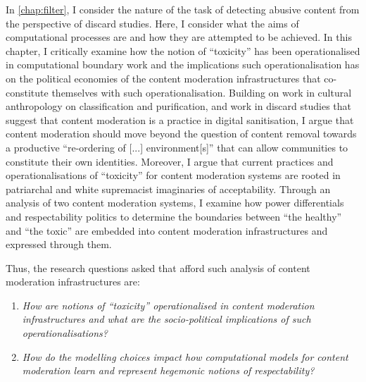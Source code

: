 In \cref{chap:filter}, I consider the nature of the task of detecting abusive content from the perspective of discard studies.
Here, I consider what the aims of computational processes are and how they are attempted to be achieved.
In this chapter, I critically examine how the notion of ``toxicity'' has been operationalised in computational boundary work and the implications such operationalisation has on the political economies of the content moderation infrastructures that co-constitute themselves with such operationalisation.
Building on work in cultural anthropology on classification and purification, and work in discard studies that suggest that content moderation is a practice in digital sanitisation, I argue that content moderation should move beyond the question of content removal towards a productive ``re-ordering of [...] environment[s]'' that can allow communities to constitute their own identities.
Moreover, I argue that current practices and operationalisations of ``toxicity'' for content moderation systems are rooted in patriarchal and white supremacist imaginaries of acceptability.
Through an analysis of two content moderation systems, I examine how power differentials and respectability politics to determine the boundaries between ``the healthy'' and ``the toxic'' are embedded into content moderation infrastructures and expressed through them.

Thus, the research questions asked that afford such analysis of content moderation infrastructures are:

\begin{center}
\begin{minipage}{0.9\textwidth}
\vspace{5mm}
    \begin{enumerate}[start=1, label={\textbf{RQ \arabic*}}]
        \item{\textit{How are notions of ``toxicity'' operationalised in content moderation infrastructures and what are the socio-political implications of such operationalisations?}}
        \item{\textit{How do the modelling choices impact how computational models for content moderation learn and represent hegemonic notions of respectability?}}
    \end{enumerate}
    \vspace{5mm}
\end{minipage}
\end{center}

